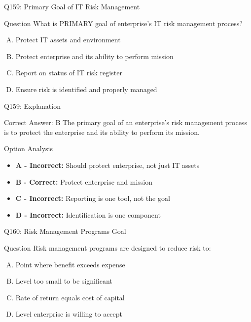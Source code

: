 \documentclass{beamer}
\begin{document}
	\begin{frame}{Q159: Primary Goal of IT Risk Management}
		\begin{block}{Question}
			What is PRIMARY goal of enterprise's IT risk management process?
		\end{block}
		\begin{enumerate}[(A)]
			\item Protect IT assets and environment
			\item Protect enterprise and its ability to perform mission
			\item Report on status of IT risk register
			\item Ensure risk is identified and properly managed
		\end{enumerate}
	\end{frame}
	
	\begin{frame}{Q159: Explanation}
		\begin{block}{Correct Answer: B}
			The primary goal of an enterprise's risk management process is to protect the enterprise and its ability to perform its mission.
		\end{block}
		\begin{block}{Option Analysis}
			\begin{itemize}
				\item \textbf{A - Incorrect:} Should protect enterprise, not just IT assets
				\item \textbf{B - Correct:} Protect enterprise and mission
				\item \textbf{C - Incorrect:} Reporting is one tool, not the goal
				\item \textbf{D - Incorrect:} Identification is one component
			\end{itemize}
		\end{block}
	\end{frame}
	
	\begin{frame}{Q160: Risk Management Programs Goal}
		\begin{block}{Question}
			Risk management programs are designed to reduce risk to:
		\end{block}
		\begin{enumerate}[(A)]
			\item Point where benefit exceeds expense
			\item Level too small to be significant
			\item Rate of return equals cost of capital
			\item Level enterprise is willing to accept
		\end{enumerate}
	\end{frame}
	
\end{document}
